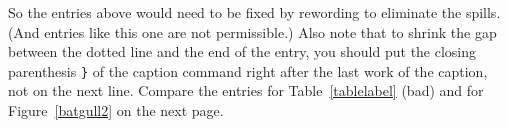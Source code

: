 %
\begin{singlespace}
\renewcommand{\cftbeforetoctitleskip}{.6in}
\renewcommand{\cftaftertoctitleskip}{1em}
\renewcommand{\contentsname}{TABLE OF CONTENTS}
\renewcommand{\cfttoctitlefont}{\hfill\large\bfseries}
\renewcommand{\cftaftertoctitle}{\hfill}
\renewcommand{\cftchapfont}{\cftsecfont}
\renewcommand{\cftchapdotsep}{\cftsecdotsep}
\renewcommand{\cftchapleader}{\normalfont\cftdotfill{\cftsecdotsep}}
\renewcommand{\cftchappagefont}{\normalfont}
\setlength{\cftparskip}{1.0\baselineskip}%
\tableofcontents





\newpage



\renewcommand{\cftbeforelottitleskip}{.6in}
\renewcommand{\cftafterlottitleskip}{1em}
\renewcommand{\listtablename}{LIST OF TABLES}
\renewcommand{\cftlottitlefont}{\hfill\large\bfseries}
\renewcommand{\cftafterlottitle}{\hfill}

\setlength{\cftparskip}{1.0\baselineskip}
\renewcommand{\cfttabpresnum}{Table~}

\newlength{\mylenTable}
\settowidth{\mylenTable}{\cfttabpresnum\cfttabaftersnum}

\listoftables

\vspace{12pt}
\noindent So the entries above would need to be fixed by
rewording to eliminate the spills.
(And entries like this one are not permissible.)
\noindent Also note that to
shrink the gap between the dotted line and the
end of the entry, you should put the closing parenthesis
\verb+}+ of the caption command right after the last work of the
caption, not on the next line. Compare the entries for
Table~\ref{tablelabel} (bad)
and for Figure~\ref{batgull2} on the next page.


\end{singlespace}
